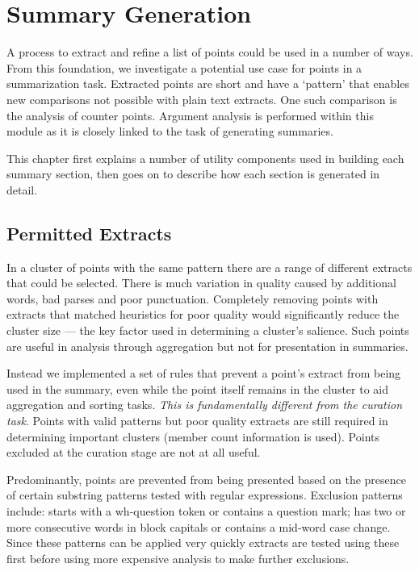 \chapter{Summary Generation\label{chap:summary-generation}}
  A process to extract and refine a list of points could be used in a number of ways. From this foundation, we investigate a potential use case for points in a summarization task. Extracted points are short and have a `pattern' that enables new comparisons not possible with plain text extracts. One such comparison is the analysis of counter points. Argument analysis is performed within this module as it is closely linked to the task of generating summaries.

  This chapter first explains a number of utility components used in building each summary section, then goes on to describe how each section is generated in detail.

  \section{Permitted Extracts}
    In a cluster of points with the same pattern there are a range of different extracts that could be selected. There is much variation in quality caused by additional words, bad parses and poor punctuation. Completely removing points with extracts that matched heuristics for poor quality would significantly reduce the cluster size --- the key factor used in determining a cluster's salience. Such points are useful in analysis through aggregation but not for presentation in summaries.

    Instead we implemented a set of rules that prevent a point's extract from being used in the summary, even while the point itself remains in the cluster to aid aggregation and sorting tasks. \textit{This is fundamentally different from the curation task}. Points with valid patterns but poor quality extracts are still required in determining important clusters (member count information is used). Points excluded at the curation stage are not at all useful.

    Predominantly, points are prevented from being presented based on the presence of certain substring patterns tested with regular expressions. Exclusion patterns include: starts with a wh-question token or contains a question mark; has two or more consecutive words in block capitals or contains a mid-word case change. Since these patterns can be applied very quickly extracts are tested using these first before using more expensive analysis to make further exclusions.

